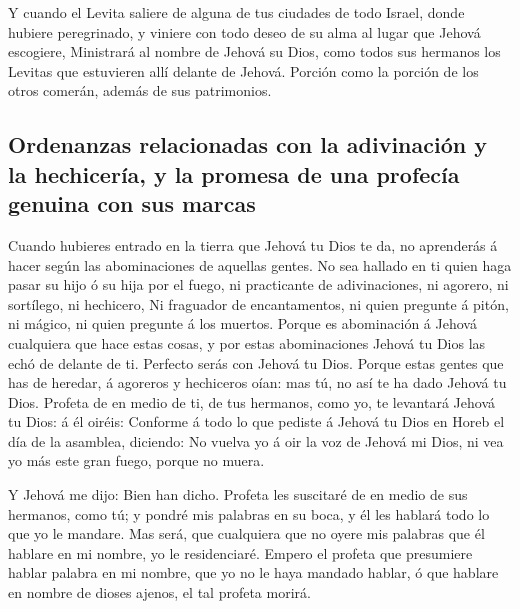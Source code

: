  Y cuando el Levita saliere de alguna de tus ciudades de
todo Israel, donde hubiere peregrinado, y viniere con todo deseo de su
alma al lugar que Jehová escogiere,  Ministrará al nombre
de Jehová su Dios, como todos sus hermanos los Levitas que estuvieren
allí delante de Jehová.  Porción como la porción de los
otros comerán, además de sus patrimonios.

\hypertarget{ordenanzas-relacionadas-con-la-adivinaciuxf3n-y-la-hechiceruxeda-y-la-promesa-de-una-profecuxeda-genuina-con-sus-marcas}{%
\subsection{Ordenanzas relacionadas con la adivinación y la hechicería,
y la promesa de una profecía genuina con sus
marcas}\label{ordenanzas-relacionadas-con-la-adivinaciuxf3n-y-la-hechiceruxeda-y-la-promesa-de-una-profecuxeda-genuina-con-sus-marcas}}

 Cuando hubieres entrado en la tierra que Jehová tu Dios
te da, no aprenderás á hacer según las abominaciones de aquellas gentes.
 No sea hallado en ti quien haga pasar su hijo ó su hija
por el fuego, ni practicante de adivinaciones, ni agorero, ni sortílego,
ni hechicero,  Ni fraguador de encantamentos, ni quien
pregunte á pitón, ni mágico, ni quien pregunte á los muertos.
 Porque es abominación á Jehová cualquiera que hace estas
cosas, y por estas abominaciones Jehová tu Dios las echó de delante de
ti.  Perfecto serás con Jehová tu Dios. 
Porque estas gentes que has de heredar, á agoreros y hechiceros oían:
mas tú, no así te ha dado Jehová tu Dios.  Profeta de en
medio de ti, de tus hermanos, como yo, te levantará Jehová tu Dios: á él
oiréis:  Conforme á todo lo que pediste á Jehová tu Dios
en Horeb el día de la asamblea, diciendo: No vuelva yo á oir la voz de
Jehová mi Dios, ni vea yo más este gran fuego, porque no muera.

 Y Jehová me dijo: Bien han dicho. 
Profeta les suscitaré de en medio de sus hermanos, como tú; y pondré mis
palabras en su boca, y él les hablará todo lo que yo le mandare.
 Mas será, que cualquiera que no oyere mis palabras que
él hablare en mi nombre, yo le residenciaré.  Empero el
profeta que presumiere hablar palabra en mi nombre, que yo no le haya
mandado hablar, ó que hablare en nombre de dioses ajenos, el tal profeta
morirá.

